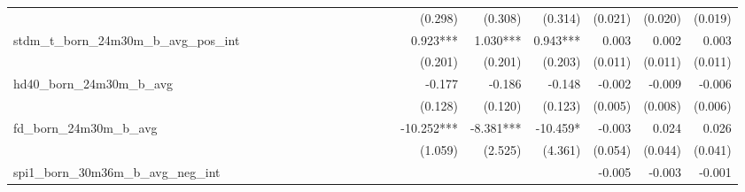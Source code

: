 \begin{tabular}{lrrrrrrrrrrrrrrrrrr}
                                            &              &              &              &              &              &              &              &              &               &              &              &               &      (0.298) &      (0.308) &       (0.314) &      (0.021) &      (0.020) &       (0.019) \\ 
stdm\_t\_born\_24m30m\_b\_avg\_pos\_int     &              &              &              &              &              &              &              &              &               &              &              &               &     0.923*** &     1.030*** &      0.943*** &        0.003 &        0.002 &         0.003 \\ 
                                            &              &              &              &              &              &              &              &              &               &              &              &               &      (0.201) &      (0.201) &       (0.203) &      (0.011) &      (0.011) &       (0.011) \\ 
hd40\_born\_24m30m\_b\_avg                  &              &              &              &              &              &              &              &              &               &              &              &               &       -0.177 &       -0.186 &        -0.148 &       -0.002 &       -0.009 &        -0.006 \\ 
                                            &              &              &              &              &              &              &              &              &               &              &              &               &      (0.128) &      (0.120) &       (0.123) &      (0.005) &      (0.008) &       (0.006) \\ 
fd\_born\_24m30m\_b\_avg                    &              &              &              &              &              &              &              &              &               &              &              &               &   -10.252*** &    -8.381*** &      -10.459* &       -0.003 &        0.024 &         0.026 \\ 
                                            &              &              &              &              &              &              &              &              &               &              &              &               &      (1.059) &      (2.525) &       (4.361) &      (0.054) &      (0.044) &       (0.041) \\ 
spi1\_born\_30m36m\_b\_avg\_neg\_int        &              &              &              &              &              &              &              &              &               &              &              &               &              &              &               &       -0.005 &       -0.003 &        -0.001 \\ 

\end{tabular}
